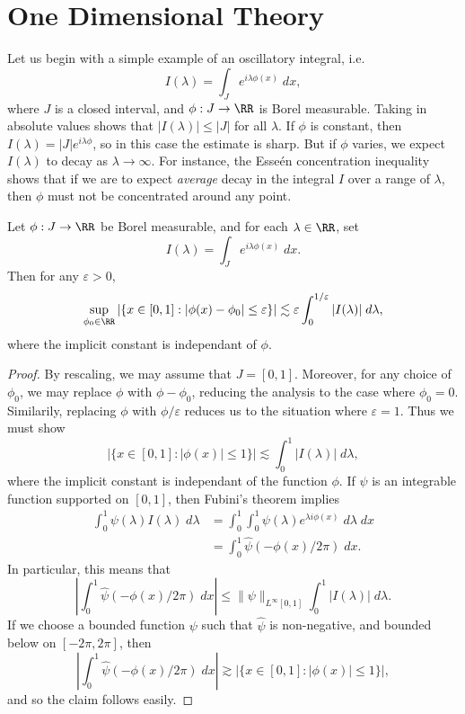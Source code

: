 \section{One Dimensional Theory}

Let us begin with a simple example of an oscillatory integral, i.e.
%
\[ I(\lambda) = \int_J e^{i \lambda \phi(x)}\; dx, \]
%
where $J$ is a closed interval, and $\phi: J \to \RR$ is Borel measurable. Taking in absolute values shows that $|I(\lambda)| \leq |J|$ for all $\lambda$. If $\phi$ is constant, then $I(\lambda) = |J| e^{i \lambda \phi}$, so in this case the estimate is sharp. But if $\phi$ varies, we expect $I(\lambda)$ to decay as $\lambda \to \infty$. For instance, the Esse\'{e}n concentration inequality shows that if we are to expect \emph{average} decay in the integral $I$ over a range of $\lambda$, then $\phi$ must not be concentrated around any point.

\begin{theorem}
  Let $\phi: J \to \RR$ be Borel measurable, and for each $\lambda \in \RR$, set
  \[ I(\lambda) = \int_J e^{i \lambda \phi(x)}\; dx. \]
  Then for any $\varepsilon > 0$,
  \[ \sup_{\phi_0 \in \RR} |\{ x \in [0,1]: |\phi(x) - \phi_0| \leq \varepsilon \}| \lesssim \varepsilon \int_0^{1/\varepsilon} |I(\lambda)|\; d\lambda, \]
  where the implicit constant is independant of $\phi$.
\end{theorem}
\begin{proof}
  By rescaling, we may assume that $J = [0,1]$. Moreover, for any choice of $\phi_0$, we may replace $\phi$ with $\phi - \phi_0$, reducing the analysis to the case where $\phi_0 = 0$. Similarily, replacing $\phi$ with $\phi/\varepsilon$ reduces us to the situation where $\varepsilon = 1$. Thus we must show
  \[ |\{ x \in [0,1]: |\phi(x)| \leq 1 \}| \lesssim \int_0^1 |I(\lambda)|\; d\lambda, \]
  where the implicit constant is independant of the function $\phi$. If $\psi$ is an integrable function supported on $[0,1]$, then Fubini's theorem implies
  \begin{align*}
    \int_0^1 \psi(\lambda) I(\lambda)\; d\lambda &= \int_0^1 \int_0^1 \psi(\lambda) e^{\lambda i \phi(x)}\; d\lambda\; dx\\
    &= \int_0^1 \widehat{\psi}(- \phi(x) / 2 \pi)\; dx.
  \end{align*}
  In particular, this means that
  \[ \left| \int_0^1 \widehat{\psi}(- \phi(x) / 2\pi)\; dx \right| \leq \| \psi \|_{L^\infty[0,1]} \int_0^1 |I(\lambda)|\; d\lambda. \]
  If we choose a bounded function $\psi$ such that $\widehat{\psi}$ is non-negative, and bounded below on $[-2\pi,2\pi]$, then
  \[ \left| \int_0^1 \widehat{\psi}(- \phi(x) / 2 \pi)\; dx \right| \gtrsim |\{ x \in [0,1]: |\phi(x)| \leq 1 \}|, \]
  and so the claim follows easily.
\end{proof}

